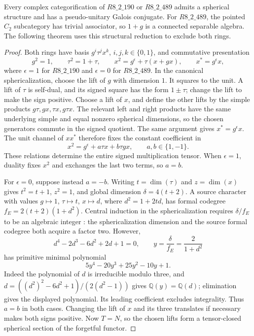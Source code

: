 \begin{proposition}\label{prop:fib-pair-galois-pu}
Every complex categorification of $R8\_2\_190$ or $R8\_2\_489$
admits a spherical structure and has a pseudo-unitary Galois
conjugate. For $R8\_2\_489$, the pointed $C_2$ subcategory has
trivial associator, so $1+g$ is a connected separable algebra.
The following theorem uses this structural reduction to exclude
both rings.
\end{proposition}
\begin{proof}
Both rings have basis $g^i\tau^jx^k$, $i,j,k\in\{0,1\}$, and
commutative presentation
\[
g^2=1,\qquad \tau^2=1+\tau,\qquad
x^2=g^\epsilon+\tau(x+gx),\qquad x^*=g^\epsilon x,
\]
where $\epsilon=1$ for $R8\_2\_190$ and $\epsilon=0$ for
$R8\_2\_489$. In the canonical sphericalization, choose the
lift of $g$ with dimension $1$. It squares to the unit.
A lift of $\tau$ is self-dual, and its signed square has the
form $1\pm\tau$; change the lift to make the sign positive.
Choose a lift of $x$, and define the other lifts by the simple
products $g\tau,gx,\tau x,g\tau x$. The relevant left and
right products have the same underlying simple and equal
nonzero spherical dimensions, so the chosen generators commute
in the signed quotient. The same argument gives
$x^*=g^\epsilon x$. The unit channel of $xx^*$ therefore fixes
the constant coefficient in
\[
x^2=g^\epsilon+a\tau x+b\tau gx,\qquad a,b\in\{1,-1\}.
\]
These relations determine the entire signed multiplication
tensor. When $\epsilon=1$, duality fixes $x^2$ and exchanges
the last two terms, so $a=b$.

For $\epsilon=0$, suppose instead $a=-b$. Writing
$t=\dim(\tau)$ and $z=\dim(x)$ gives $t^2=t+1$, $z^2=1$,
and global dimension $\delta=4(t+2)$.
A source character with values $g\mapsto1$, $\tau\mapsto t$,
$x\mapsto d$, where $d^2=1+2td$, has formal codegree
$f_E=2(t+2)(1+d^2)$. Central induction in the sphericalization
requires $\delta/f_E$ to be an algebraic integer
\cite[Theorem~2.13]{OstrikPiv3}: the sphericalization dimension
and the source formal codegree both acquire a factor two.
However,
\[
d^4-2d^3-6d^2+2d+1=0,\qquad
 y=\frac{\delta}{f_E}=\frac{2}{1+d^2}
\]
has primitive minimal polynomial
\[
5y^4-20y^3+25y^2-10y+1.
\]
Indeed the polynomial of $d$ is irreducible modulo three, and
$d=((d^2)^2-6d^2+1)/(2(d^2-1))$ gives
$\mathbb Q(y)=\mathbb Q(d)$; elimination gives the displayed
polynomial. Its leading coefficient excludes integrality.
Thus $a=b$ in both cases. Changing the lift of $x$ and its
three translates if necessary makes both signs positive.
Now $T=N$, so the chosen lifts form a tensor-closed spherical
section of the forgetful functor.


\end{proof}
